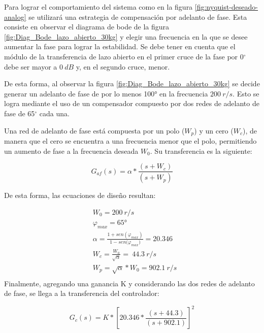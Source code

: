 Para lograr el comportamiento del sistema como en la figura 	\ref{fig:nyquist-deseado-analog} se utilizará una estrategia de compensación por adelanto de fase. Esta consiste en observar el diagrama de bode de la figura \ref{fig:Diag_Bode_lazo_abierto_30kg} y elegir una frecuencia en la que se desee aumentar la fase para lograr la estabilidad. Se debe tener en cuenta que el módulo de la transferencia de lazo abierto en el primer cruce de la fase por 0$\mathrm{{}^\circ}$ debe ser mayor a $0\:dB$ y, en el segundo cruce, menor. 

De esta forma, al observar la figura \ref{fig:Diag_Bode_lazo_abierto_30kg} se decide generar un adelanto de fase de por lo menos 100° en la frecuencia $200\:r/s$. Esto se logra mediante el uso de un compensador compuesto por dos redes de adelanto de fase de 65$\mathrm{{}^\circ}$ cada una. 

Una red de adelanto de fase está compuesta por un polo ($W_p$) y un cero ($W_c$), de manera que el cero se encuentra a una frecuencia menor que el polo, permitiendo un aumento de fase a la frecuencia deseada $W_0$. Su transferencia es la siguiente:

\begin{equation} \label{eq_tf_adelanto}
	G_{af}(s)=\alpha*\frac{(s + W_c)}{(s + W_p)}
\end{equation}

\noindent De esta forma, las ecuaciones de dise\~{n}o resultan:

\begin{equation*}
	\begin{aligned}
		&W_0 =200\:r/s\\
		&{\varphi }_{max} =65\textrm{°}\\
		&\alpha =\frac{1+sen({\varphi }_{max})}{1-sen{(\varphi }_{max})}=20.346\\
		&W_c =\frac{W_0}{\sqrt{\alpha }}=\ 44.3\:r/s\\
		&W_p =\sqrt{\alpha }*W_0=902.1\: r/s\\
	\end{aligned}
\end{equation*} 
\noindent Finalmente, agregando una ganancia K y considerando las dos redes de adelanto de fase, se llega a la transferencia del controlador:

\begin{equation}  
	G_c(s)=K*{[20.346*\frac{(s+44.3)}{(s+902.1)}]}^2
	\label{eq:transferencia-del-compensador}
\end{equation} 

